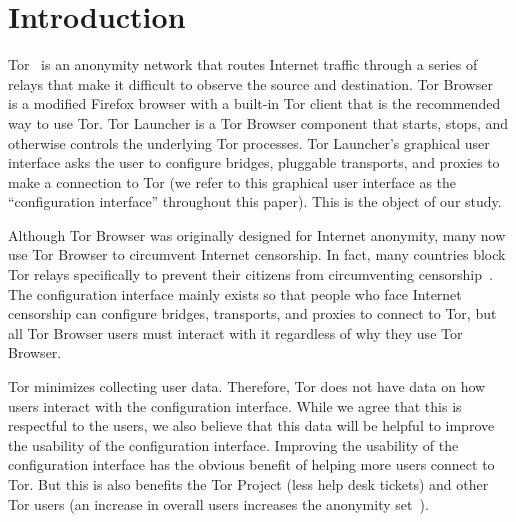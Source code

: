 \documentclass[USenglish,oneside,twocolumn]{article}
\begin{document}


\maketitle

\section{Introduction}

Tor~\cite{dingledine2004tor} is an anonymity network that routes Internet traffic through a series of relays 
that make it difficult to observe the source and destination. 
Tor Browser~\cite{torbrowser} is a modified Firefox browser with a built-in Tor client that
is the recommended way to use Tor. Tor Launcher is a Tor Browser component that
starts, stops, and otherwise controls the underlying Tor processes.
Tor Launcher's graphical user interface asks the user to configure
bridges, pluggable transports, and proxies to make a connection to Tor (we refer to this graphical user interface as the ``configuration interface'' throughout this paper). This is the object of our study. 

Although Tor Browser was originally designed for Internet anonymity, many now use Tor Browser to circumvent Internet censorship. In fact, many countries block Tor relays specifically to prevent their citizens from circumventing censorship~\cite{winter2012great}. The configuration interface mainly exists so that people who face Internet censorship can configure bridges, transports, and proxies to connect to Tor, but all Tor Browser users must interact with it regardless of why they use Tor Browser.

Tor minimizes collecting user data. Therefore, Tor does not have data on how users interact with the configuration interface. While we agree that this is respectful to the users, we also believe that this data will be helpful to improve the usability of the configuration interface. Improving the usability of the configuration interface has the obvious benefit of helping more users connect to Tor. But this is also benefits the Tor Project (less help desk tickets) and other Tor users (an increase in overall users increases the anonymity set~\cite{dingledine2006anonymity}). 
\end{document}
